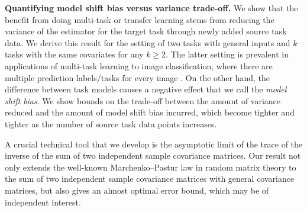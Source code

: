 
{\bf Quantifying model shift bias versus variance trade-off.}
	We show that the benefit from doing multi-task or transfer learning stems from reducing the variance of the estimator for the target task through newly added source task data.
	We derive this result for the setting of two tasks with general inputs and $k$ tasks with the same covariates for any $k \ge 2$.
	The latter setting is prevalent in applications of multi-task learning to image classification, where there are multiple prediction labels/tasks for every image \cite{EA20}.
	On the other hand, the difference between task models causes a negative effect that we call the \textit{model shift bias}.
	We show bounds on the trade-off between the amount of variance reduced and the amount of model shift bias incurred, which become tighter and tighter as the number of source task data points increases.

	A crucial technical tool that we develop is the asymptotic limit of the trace of the inverse of the sum of two independent sample covariance matrices. Our result not only extends the well-known Marchenko–Pastur law in random matrix theory to the sum of two independent sample covariance matrices with general covariance matrices, but also gives an almost optimal error bound, which may be of independent interest.

